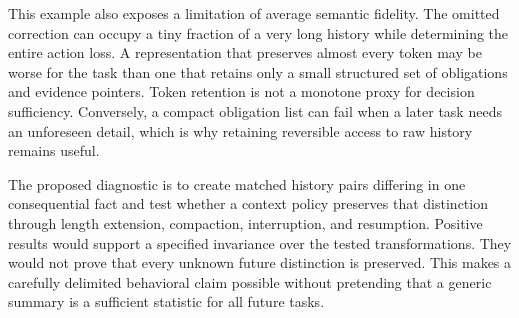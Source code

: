 This example also exposes a limitation of average semantic fidelity. The omitted correction can occupy a tiny fraction of a very long history while determining the entire action loss. A representation that preserves almost every token may be worse for the task than one that retains only a small structured set of obligations and evidence pointers. Token retention is not a monotone proxy for decision sufficiency. Conversely, a compact obligation list can fail when a later task needs an unforeseen detail, which is why retaining reversible access to raw history remains useful.

The proposed diagnostic is to create matched history pairs differing in one consequential fact and test whether a context policy preserves that distinction through length extension, compaction, interruption, and resumption. Positive results would support a specified invariance over the tested transformations. They would not prove that every unknown future distinction is preserved. This makes a carefully delimited behavioral claim possible without pretending that a generic summary is a sufficient statistic for all future tasks.

